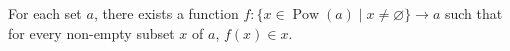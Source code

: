 For each set $a$, there exists a function $f: \{x \in \operatorname{Pow}(a) \mid x \neq \varnothing\} \to a$ such that for every non-empty subset $x$ of $a$, $f(x) \in x$.
